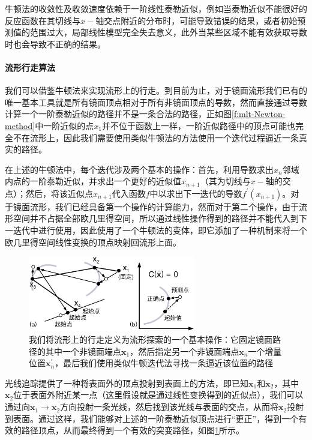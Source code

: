 牛顿法的收敛性及收敛速度依赖于一阶线性泰勒近似，例如当泰勒近似不能很好的反应函数在其切线与$x-$轴交点附近的分布时，可能导致错误的结果，或者初始预测值的范围过大，局部线性模型完全失去意义，此外当某些区域不能有效获取导数时也会导致不正确的结果。




\paragraph{流形行走算法}
我们可以借鉴牛顿法来实现流形上的行走。到目前为止，对于镜面流形我们已有的唯一基本工具就是所有镜面顶点相对于所有非镜面顶点的导数，然而直接通过导数计算一个一阶泰勒近似的路径并不是一条合法的路径，正如图\ref{f:mlt-Newton-method}中一阶近似的点$x_1$并不位于函数上一样，一阶近似路径中的顶点可能也完全不在流形上，因此我们需要使用类似牛顿法的方法使用一个迭代过程逼近一条真实的路径。

在上述的牛顿法中，每个迭代涉及两个基本的操作：首先，利用导数求出$x_n$邻域内点的一阶泰勒近似，并求出一个更好的近似值$x_{n+1}$（其为切线与$x-$轴的交点）；然后，将该近似点$x_{n+1}$代入函数$f$中以求出下一迭代的导数$f^{'}(x_{n+1})$。对于镜面流形，我们已经具备第一个操作的计算能力，然而对于第二个操作，由于流形空间并不占据全部欧几里得空间，所以通过线性操作得到的路径并不能代入到下一迭代中进行使用，因此\cite{a:ManifoldExplorationAMarkovChainMonteCarloTechniqueforRenderingSceneswithDifficultSpecularTransport}使用了一个牛顿法的变体，即它添加了一种机制来将一个欧几里得空间线性变换的顶点映射回流形上面。

\begin{figure}
	\sidecaption
	\includegraphics[width=0.65\textwidth]{figures/mlt/manifold-walk}
	\caption{我们将流形上的行走定义为流形探索的一个基本操作：它固定镜面路径的其中一个非镜面端点$\mathbf{x}_1$，然后指定另一个非镜面端点$\mathbf{x}_n$一个增量位置$\mathbf{x}^{'}_n$，最后我们使用类似牛顿迭代法寻找一条逼近该位置的路径}
	\label{f:mlt-manifold-walk}
\end{figure}

光线追踪提供了一种将表面外的顶点投射到表面上的方法，即已知$\mathbf{x}_1$和$\mathbf{x}_2$，其中$\mathbf{x}_2$位于表面外附近某一点（这里假设就是通过线性变换得到的近似点），我们可以通过向$\mathbf{x}_1\to\mathbf{x}_2$方向投射一条光线，然后找到该光线与表面的交点，从而将$\mathbf{x}_2$投射到表面。通过这样，我们能够对上述的一阶泰勒近似顶点进行“更正”，得到一个有效的路径顶点，从而最终得到一个有效的突变路径，如图\ref{f:mlt-manifold-walk}所示。

